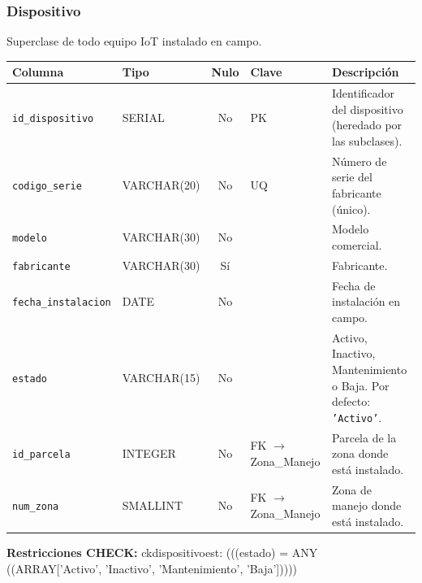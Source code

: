 \documentclass[11pt,letterpaper]{article}
\newcommand{\tbus}{\textunderscore\allowbreak}
\newcommand{\tb}[1]{{\ttfamily\let\_\tbus #1}}
\begin{document}
\subsubsection*{Dispositivo}
Superclase de todo equipo IoT instalado en campo.
{\footnotesize
\begin{longtable}{>{\raggedright\arraybackslash}p{3.3cm}>{\raggedright\arraybackslash}p{2.5cm}c>{\raggedright\arraybackslash}p{2.2cm}>{\raggedright\arraybackslash}p{6.1cm}}
\toprule
\textbf{Columna} & \textbf{Tipo} & \textbf{Nulo} & \textbf{Clave} & \textbf{Descripción} \\
\midrule
\endhead
\texttt{id\_dispositivo} & SERIAL & No & PK & Identificador del dispositivo (heredado por las subclases). \\
\texttt{codigo\_serie} & VARCHAR(20) & No & UQ & Número de serie del fabricante (único). \\
\texttt{modelo} & VARCHAR(30) & No &  & Modelo comercial. \\
\texttt{fabricante} & VARCHAR(30) & Sí &  & Fabricante. \\
\texttt{fecha\_instalacion} & DATE & No &  & Fecha de instalación en campo. \\
\texttt{estado} & VARCHAR(15) & No &  & Activo, Inactivo, Mantenimiento o Baja. Por defecto: \texttt{'Activo'}. \\
\texttt{id\_parcela} & INTEGER & No & FK $\to$ Zona\_Manejo & Parcela de la zona donde está instalado. \\
\texttt{num\_zona} & SMALLINT & No & FK $\to$ Zona\_Manejo & Zona de manejo donde está instalado. \\
\bottomrule
\end{longtable}}
{\footnotesize\raggedright\textbf{Restricciones CHECK:} \tb{ck\_dispositivo\_est}: \tb{(((estado) = ANY ((ARRAY['Activo', 'Inactivo', 'Mantenimiento', 'Baja']))))}\par}
\medskip
\end{document}
